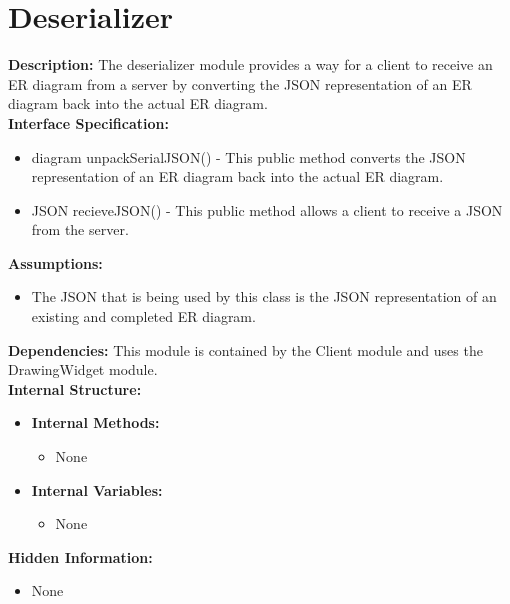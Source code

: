 \chapter{Deserializer}
\textbf{Description:} The deserializer module provides a way for a client to receive an ER diagram from a server by converting the JSON representation of an ER diagram back into the actual ER diagram. \\
\textbf{Interface Specification:}
\begin{itemize}
\item{diagram unpackSerialJSON() - This public method converts the JSON representation of an ER diagram back into the actual ER diagram.}
\item{JSON recieveJSON() - This public method allows a client to receive a JSON from the server.}
\end{itemize}
\textbf{Assumptions:}
\begin{itemize}
\item{The JSON that is being used by this class is the JSON representation of an existing and completed ER diagram.}
\end{itemize}
\textbf{Dependencies:}
This module is contained by the Client module and uses the DrawingWidget module. \\
\textbf{Internal Structure:}
\begin{itemize}
        	\item{\textbf{Internal Methods:} 
        	\begin{itemize}
        	\item{None}
        	\end{itemize}}
        	\item{\textbf{Internal Variables:} 
        	\begin{itemize}
        	\item{None}
        	\end{itemize}}
\end{itemize}
\textbf{Hidden Information:}
\begin{itemize}
\item{None}
\end{itemize}
 
